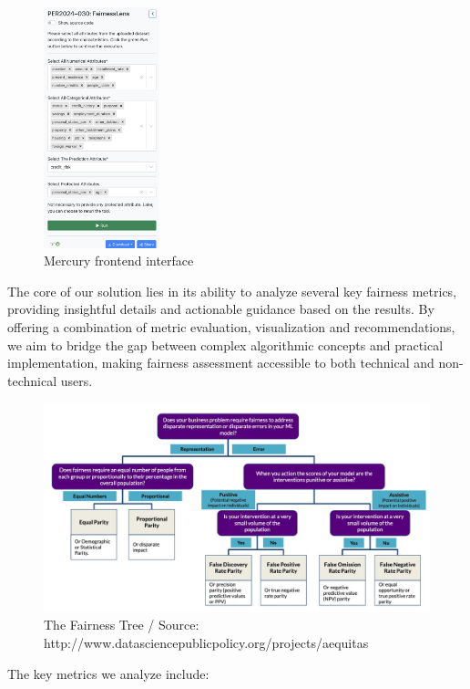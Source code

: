 \documentclass[runningheads]{llncs}
\begin{document}
\begin{figure}
\centering
\includegraphics[width=0.3\textwidth]{images/mercury-interface.png}
\caption{Mercury frontend interface} \label{}
\end{figure}

The core of our solution lies in its ability to analyze several key fairness metrics, providing insightful details and actionable guidance based on the results. By offering a combination of metric evaluation, visualization and recommendations, we aim to bridge the gap between complex algorithmic concepts and practical implementation, making fairness assessment accessible to both technical and non-technical users.

\begin{figure}[H]
\includegraphics[width=\textwidth]{images/fairness-tree.png}
\caption{The Fairness Tree / Source: http://www.datasciencepublicpolicy.org/projects/aequitas} \label{fairness-tree}
\end{figure}

The key metrics we analyze include:
\end{document}
